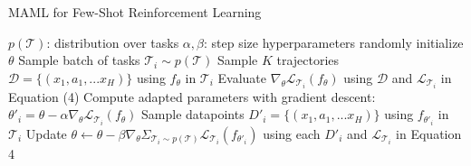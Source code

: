 \begin{algorithm}
    \caption{MAML for Few-Shot Reinforcement Learning}
    \label{MAML-reinforcement}
    \begin{algorithmic}[1]
      \REQUIRE $p(\mathcal{T})$: distribution over tasks
      \REQUIRE $\alpha, \beta$: step size hyperparameters
      \STATE randomly initialize $\theta$
      \STATE Sample batch of tasks $\mathcal{T}_i \sim p(\mathcal{T})$
      \STATE Sample $K$ trajectories $\mathcal{D}=\{(x_1,a_1,...x_H)\}$ using $f_\theta$ in $\mathcal{T}_i$
      \STATE Evaluate $\nabla_\theta \mathcal{L}_{\mathcal{T}_i} (f_\theta)$ using $\mathcal{D}$ and $\mathcal{L}_{\mathcal{T}_i}$ in Equation (4)
      \STATE Compute adapted parameters with gradient descent: $\theta'_i = \theta - \alpha\nabla_\theta \mathcal{L}_{\mathcal{T}_i} (f_\theta)$
      \STATE Sample datapoints $D'_i=\{(x_1,a_1,...x_H)\}$ using $f_{\theta'_i}$ in $\mathcal{T}_i$
      \ENDFOR
      \STATE Update $\theta \leftarrow \theta - \beta\nabla_\theta \Sigma_{\mathcal{T}_i \sim p(\mathcal{T})}\mathcal{L}_{\mathcal{T}_i} (f_{\theta'_i})$  using each $D'_i$ and $\mathcal{L}_{\mathcal{T}_i} $ in Equation 4
      \ENDWHILE
    \end{algorithmic}
  \end{algorithm}



